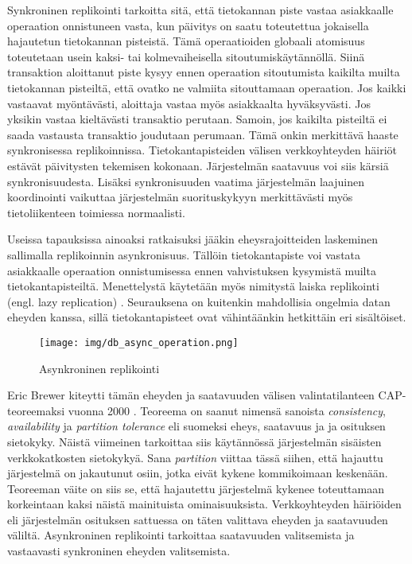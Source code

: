 \documentclass[finnish,twoside,censored,csm,sw-track-2018]{HYthesisML}
\begin{document}
Synkroninen replikointi tarkoitta sitä, että tietokannan piste vastaa asiakkaalle operaation onnistuneen vasta, kun päivitys on saatu toteutettua jokaisella hajautetun tietokannan pisteistä. Tämä operaatioiden globaali atomisuus toteutetaan usein kaksi- tai kolmevaiheisella sitoutumiskäytännöllä. Siinä transaktion aloittanut piste kysyy ennen operaation sitoutumista kaikilta muilta tietokannan pisteiltä, että ovatko ne valmiita sitouttamaan operaation. Jos kaikki vastaavat myöntävästi, aloittaja vastaa myös asiakkaalta hyväksyvästi. Jos yksikin vastaa kieltävästi transaktio perutaan. Samoin, jos kaikilta pisteiltä ei saada vastausta transaktio joudutaan perumaan. Tämä onkin merkittävä haaste synkronisessa replikoinnissa. Tietokantapisteiden välisen verkkoyhteyden häiriöt estävät päivitysten tekemisen kokonaan. Järjestelmän saatavuus voi siis kärsiä synkronisuudesta. Lisäksi synkronisuuden vaatima järjestelmän laajuinen koordinointi vaikuttaa järjestelmän suorituskykyyn merkittävästi myös tietoliikenteen toimiessa normaalisti.

Useissa tapauksissa ainoaksi ratkaisuksi jääkin eheysrajoitteiden laskeminen sallimalla replikoinnin asynkronisuus. Tällöin tietokantapiste voi vastata asiakkaalle operaation onnistumisessa ennen vahvistuksen kysymistä muilta tietokantapisteiltä. Menettelystä käytetään myös nimitystä laiska replikointi (engl. lazy replication) \citep{gray-replication}. Seurauksena on kuitenkin mahdollisia ongelmia datan eheyden kanssa, sillä tietokantapisteet ovat vähintäänkin hetkittäin eri sisältöiset.

\begin{figure}[ht]
  \centering
    \texttt{[image: img/db\_async\_operation.png]}
  \caption{Asynkroninen replikointi}
  \label{fig-async-replikointi}
\end{figure}

Eric Brewer kiteytti tämän eheyden ja saatavuuden välisen valintatilanteen CAP-teoreemaksi vuonna 2000 \cite{CAP}. Teoreema on saanut nimensä sanoista \textit{consistency}, \textit{availability} ja \textit{partition tolerance} eli suomeksi eheys, saatavuus ja ja osituksen sietokyky. Näistä viimeinen tarkoittaa siis käytännössä järjestelmän sisäisten verkkokatkosten sietokykyä. Sana \textit{partition} viittaa tässä siihen, että hajauttu järjestelmä on jakautunut osiin, jotka eivät kykene kommikoimaan keskenään. Teoreeman väite on siis se, että hajautettu järjestelmä kykenee toteuttamaan korkeintaan kaksi näistä mainituista ominaisuuksista. Verkkoyhteyden häiriöiden eli järjestelmän osituksen sattuessa on täten valittava eheyden ja saatavuuden väliltä. Asynkroninen replikointi tarkoittaa saatavuuden valitsemista ja vastaavasti synkroninen eheyden valitsemista.
\end{document}
